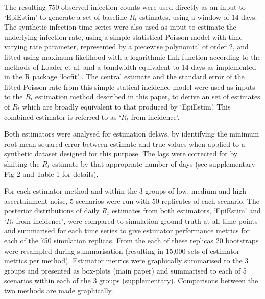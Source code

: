 \documentclass[10pt,letterpaper]{article}
\begin{document}
The resulting 750 observed infection counts were used directly as an input to `EpiEstim' to generate a set of baseline $R_t$ estimates, using a window of 14 days. The synthetic infection time-series were also used as input to estimate the underlying infection rate, using a simple statistical Poisson model with time varying rate parameter, represented by a piecewise polynomial of order 2, and fitted using maximum likelihood with a logarithmic link function according to the methods of Loader et al. \cite{loader1999} and a bandwidth equivalent to 14 days as implemented in the R package `locfit' \cite{loader2020}. The central estimate and the standard error of the fitted Poisson rate from this simple statical incidence model were used as inputs to the $R_t$ estimation method described in this paper, to derive an set of estimates of $R_t$ which are broadly equivalent to that produced by `EpiEstim'. This combined estimator is referred to as `$R_t$ from incidence'.

Both estimators were analysed for estimation delays, by identifying the minimum root mean squared error between estimate and true values when applied to a synthetic dataset designed for this purpose. The lags were corrected for by shifting the $R_t$ estimate by that appropriate number of days (see supplementary Fig 2 and Table 1 for details).

For each estimator method and within the 3 groups of low, medium and high ascertainment noise, 5 scenarios were run with 50 replicates of each scenario. The posterior distributions of daily $R_t$ estimates from both estimators, `EpiEstim' and `$R_t$ from incidence', were compared to simulation ground truth at all time points and summarised for each time series to give estimator performance metrics for each of the 750 simulation replicas. From the each of these replicas 20 bootstraps were resampled during summarisation (resulting in 15,000 sets of estimator metrics per method). Estimator metrics were graphically summarised to the 3 groups and presented as box-plots (main paper) and summarised to each of 5 scenarios within each of the 3 groups (supplementary). Comparisons between the two methods are made graphically.
\end{document}
